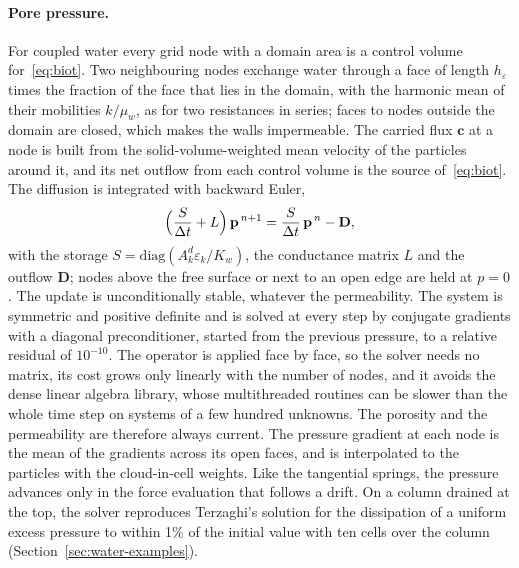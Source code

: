 \paragraph{Pore pressure.}  For coupled water every grid node with a domain area
is a control volume for~\eqref{eq:biot}.  Two neighbouring nodes exchange water
through a face of length $h_{\varepsilon}$ times the fraction of the face that
lies in the domain, with the harmonic mean of their mobilities $k/\mu_{w}$, as
for two resistances in series; faces to nodes outside the domain are closed,
which makes the walls impermeable.  The carried flux $\mathbf{c}$ at a node is
built from the solid-volume-weighted mean velocity of the particles around it,
and its net outflow from each control volume is the source of~\eqref{eq:biot}.
The diffusion is integrated with backward Euler,
\begin{equation}
  \Bigl(\frac{S}{\Delta t}+L\Bigr)\,\mathbf{p}^{\,n+1}
  = \frac{S}{\Delta t}\,\mathbf{p}^{\,n} - \mathbf{D},
  \label{eq:pressure-update}
\end{equation}
with the storage $S=\mathrm{diag}(A^{d}_{k}\varepsilon_{k}/K_{w})$, the
conductance matrix $L$ and the outflow $\mathbf{D}$; nodes above the free surface
or next to an open edge are held at $p=0$.  The update is unconditionally stable,
whatever the permeability.  The system is symmetric and positive definite and is
solved at every step by conjugate gradients with a diagonal preconditioner,
started from the previous pressure, to a relative residual of $10^{-10}$.  The
operator is applied face by face, so the solver needs no matrix, its cost grows
only linearly with the number of nodes, and it avoids the dense linear algebra
library, whose multithreaded routines can be slower than the whole time step on
systems of a few hundred unknowns.  The porosity and the permeability are
therefore always current.  The pressure gradient at each node
is the mean of the gradients across its open faces, and is interpolated to the
particles with the cloud-in-cell weights.  Like the tangential springs, the
pressure advances only in the force evaluation that follows a drift.  On a
column drained at the top, the solver reproduces Terzaghi's solution for the
dissipation of a uniform excess pressure to within \num{1}\% of the initial
value with ten cells over the column (Section~\ref{sec:water-examples}).

